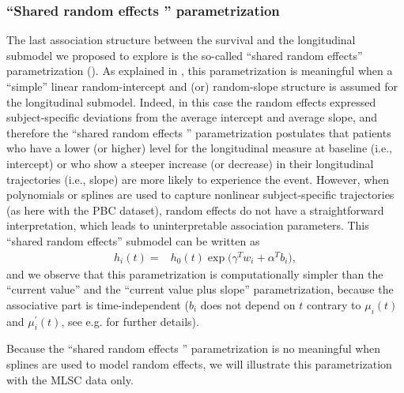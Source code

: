 \documentclass[12pt]{article}
\begin{document}
\subsubsection{``Shared random effects '' parametrization}
\label{SRE}
The last association structure between the survival and the longitudinal submodel we proposed to explore is the so-called ``shared random effects'' parametrization (\cite{Wulfsohn1997}). As explained in \cite{Rizopoulos_JASA}, this parametrization is meaningful when a ``simple'' linear random-intercept and (or) random-slope structure is assumed for the longitudinal submodel. Indeed, in this case the random effects expressed subject-specific deviations from the average intercept and average slope, and therefore the ``shared random effects '' parametrization postulates that patients who have a lower (or higher) level for the longitudinal measure at baseline (i.e., intercept) or who show a steeper increase (or decrease) in their longitudinal trajectories (i.e., slope) are more likely to experience the event. However, when polynomials or splines are used to capture nonlinear subject-specific trajectories (as here with the PBC dataset), random effects do not have a straightforward interpretation, which leads to uninterpretable association parameters. 
This ``shared random effects'' submodel can be written as
\begin{equation}
\begin{split}
h_i(t) = &h_0 (t) \exp \big(\gamma^T w_i +\alpha^{T}b_i\big),
\end{split}
\label{SRE_1}
\end{equation}
and we observe that this parametrization is computationally simpler than the ``current value'' and the ``current value plus slope'' parametrization, because the associative part is time-independent ($b_i$ does not depend on $t$ contrary to $\mu_i(t)$ and $\mu_i^{'}(t)$, see e.g. \cite{Rizopoulos_JASA} for further details).

Because the ``shared random effects '' parametrization is no meaningful when splines are used to model random effects, we will illustrate this parametrization with the MLSC data only.
\end{document}
